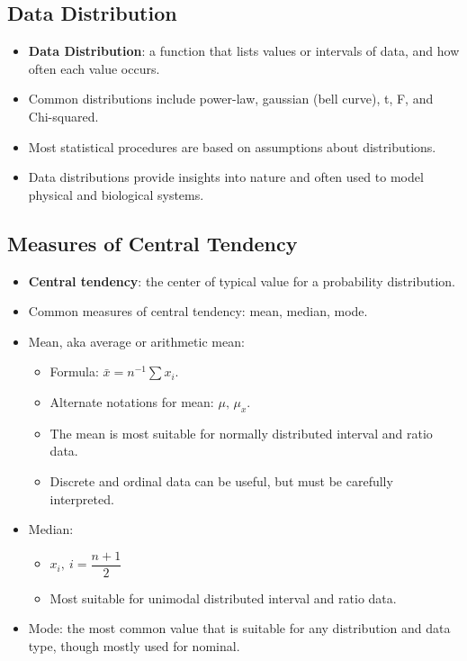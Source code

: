 \documentclass[12pt,a4paper]{article}
\begin{document}
\subsection{Data Distribution}
\begin{itemize}
    \item \textbf{Data Distribution}: a function that lists values or intervals of data, and how often each value occurs. 
    \item Common distributions include power-law, gaussian (bell curve), t, F, and Chi-squared.
    \item Most statistical procedures are based on assumptions about distributions.
    \item Data distributions provide insights into nature and often used to model physical and biological systems.
\end{itemize}

\subsection{Measures of Central Tendency}
\begin{itemize}
    \item \textbf{Central tendency}: the center of typical value for a probability distribution. 
    \item Common measures of central tendency: {\color{o-Sun}mean, median, mode}.
    \item {\color{o-Sun}Mean}, aka average or arithmetic mean: 
    \begin{itemize}
        \item Formula: {\color{o-Sun}\(\bar{x}=n^{-1}\sum{x_i}\)}.
        \item Alternate notations for mean: \(\mu,\,\mu_x\).
        \item The mean is most suitable for normally distributed interval and ratio data.
        \item Discrete and ordinal data can be useful, but must be carefully interpreted.
    \end{itemize}
    \item {\color{o-Sun}Median}:
        \begin{itemize}
            \item {\color{o-Sun}\(x_i,~i=\dfrac{n+1}{2}\)}
            \item Most suitable for unimodal distributed interval and ratio data.
        \end{itemize}
    \item {\color{o-Sun}Mode}: the most common value that is suitable for any distribution and data type, though mostly used for nominal.
\end{itemize}
\end{document}
